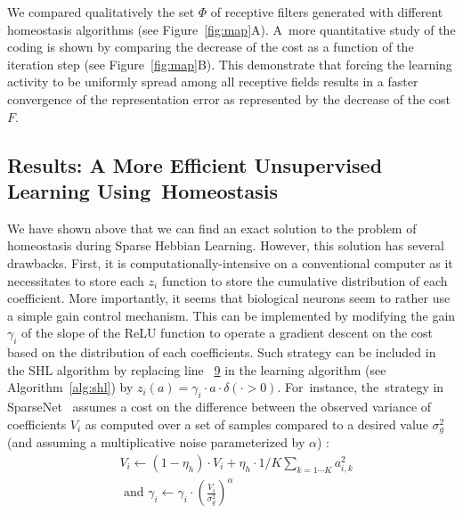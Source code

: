 \documentclass[vision,article,accept,oneauthor,pdftex]{Definitions/mdpi}
\newcommand{\dico}{\Phi} %
\newcommand{\seeFig}[1]{Figure~\ref{fig:#1}}%
\begin{document}
We compared qualitatively the set $\dico$ of receptive filters generated with different homeostasis algorithms (see Figure~\ref{fig:map}A). A~more quantitative study of the coding is shown by comparing the decrease of the cost as a function of the iteration step (see Figure~\ref{fig:map}B). This demonstrate that forcing the learning activity to be uniformly spread among all receptive fields results in a faster convergence of the representation error as represented by the decrease of the cost $F$. %
\subsection{Results: A More Efficient Unsupervised Learning Using~Homeostasis}\label{results}

We have shown above that we can find an exact solution to the problem of homeostasis during Sparse Hebbian Learning. However, this solution has several drawbacks. First, it is computationally-intensive on a conventional computer as it necessitates to store each $z_i$ function to store the cumulative distribution of each coefficient. More importantly, it seems that biological neurons seem to rather use a simple gain control mechanism. This can be implemented by modifying the gain $\gamma_i$ of the slope of the ReLU function to operate a gradient descent on the cost based on the distribution of each coefficients. Such strategy can be included in the SHL algorithm by replacing line~ \hyperlink{here2}{9} in the learning algorithm (see Algorithm~\ref{alg:shl}) by $z_i( a ) = \gamma_i \cdot a \cdot \delta(\cdot >0)$. For~instance, the~strategy in {\sc SparseNet}~\citep{Olshausen97} assumes a cost on the difference between the observed variance of coefficients $V_i$ as computed over a set of samples compared to a desired value $\sigma_g^2$ (and assuming a multiplicative noise parameterized by $\alpha$) :
\begin{align}
&V_i \leftarrow (1- \eta_h ) \cdot V_i + \eta_h \cdot 1/K\sum_{k=1\cdots K} a_{i, k}^2 \\ &\textrm{ and }
\gamma_i \leftarrow \gamma_i \cdot \left( \frac{V_i}{\sigma_g^2} \right)^\alpha
\end{align}%
\end{document}
